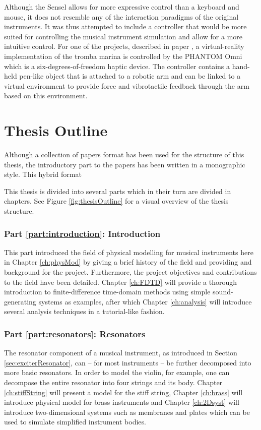 Although the Sensel allows for more expressive control than a keyboard and mouse, it does not resemble any of the interaction paradigms of the original instruments. It was thus attempted to include a controller that would be more suited for controlling the musical instrument simulation and allow for a more intuitive control.
For one of the projects, described in paper \citeP[E], a virtual-reality implementation of the tromba marina is controlled by the PHANTOM Omni \cite{phantom} which is a six-degrees-of-freedom haptic device. The controller contains a hand-held pen-like object that is attached to a robotic arm and can be linked to a virtual environment to provide force and vibrotactile feedback through the arm based on this environment. 

\section{Thesis Outline} 
Although a collection of papers format has been used for the structure of this thesis, the introductory part to the papers has been written in a monographic style. This hybrid format  

This thesis is divided into several parts which in their turn are divided in chapters. See Figure \ref{fig:thesisOutline} for a visual overview of the thesis structure. 

\subsubsection{Part \ref{part:introduction}: Introduction}
This part introduced the field of physical modelling for musical instruments here in Chapter \ref{ch:physMod} by giving a brief history of the field and providing and background for the project. Furthermore, the project objectives and contributions to the field have been detailed. Chapter \ref{ch:FDTD} will provide a thorough introduction to finite-difference time-domain methods using simple sound-generating systems as examples, after which Chapter \ref{ch:analysis} will introduce several analysis techniques in a tutorial-like fashion.

\subsubsection{Part \ref{part:resonators}: Resonators}
The resonator component of a musical instrument, as introduced in Section \ref{sec:exciterResonator}, can -- for most instruments -- be further decomposed into more basic resonators. In order to model the violin, for example, one can decompose the entire resonator into four strings and its body. Chapter \ref{ch:stiffString} will present a model for the stiff string, Chapter \ref{ch:brass} will introduce physical model for brass instruments and Chapter \ref{ch:2Dsyst} will introduce two-dimensional systems such as membranes and plates which can be used to simulate simplified instrument bodies.

